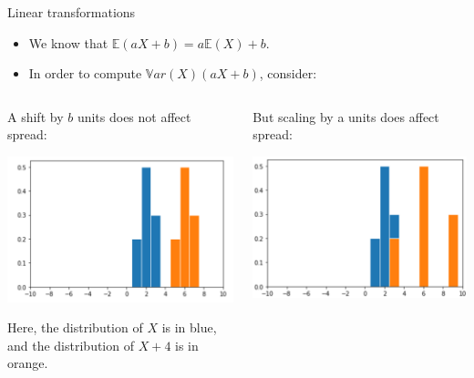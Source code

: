 \documentclass[aspectratio=169]{../latex_main/tntbeamer}  %
\begin{document}
	
	\begin{frame}[c]{Linear transformations}
	    
	    \begin{itemize}
	        \item We know that  $\mathbb{E}(aX + b) = a\mathbb{E}(X) + b$.
	        \item In order to compute $\mathbb{V}ar(X)(aX + b)$, consider:\\
	    \end{itemize}
	    
	    \begin{columns}
	    
	        \begin{column}{.5\textwidth}
	        
	                A shift by $b$ units does not affect spread:

                        \centering
	                    \includegraphics[scale=.5]{Bild7}
	                    
	                Here, the distribution of $X$ is in blue, and the distribution of $X+4$ is in orange.
	        \end{column}
	        
	        
	        \begin{column}{.5\textwidth}
	        
	                But scaling by a units does affect spread:
                        
                        \centering
	                    \includegraphics[scale=.35]{Bild8}


\end{column}
\end{columns}
\end{frame}
\end{document}
